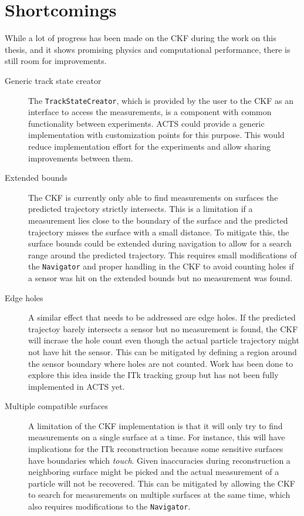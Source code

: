 \section{Shortcomings}

While a lot of progress has been made on the CKF during the work on this thesis, and it shows promising physics and computational performance, there is still room for improvements.

\begin{description}
    \item[Generic track state creator] The \texttt{TrackStateCreator}, which is provided by the user to the CKF as an interface to access the measurements, is a component with common functionality between experiments. ACTS could provide a generic implementation with customization points for this purpose. This would reduce implementation effort for the experiments and allow sharing improvements between them.
    \item[Extended bounds] The CKF is currently only able to find measurements on surfaces the predicted trajectory strictly intersects. This is a limitation if a measurement lies close to the boundary of the surface and the predicted trajectory misses the surface with a small distance. To mitigate this, the surface bounds could be extended during navigation to allow for a search range around the predicted trajectory. This requires small modifications of the \texttt{Navigator} and proper handling in the CKF to avoid counting holes if a sensor was hit on the extended bounds but no measurement was found.
    \item[Edge holes] A similar effect that needs to be addressed are edge holes. If the predicted trajectoy barely intersects a sensor but no measurement is found, the CKF will incrase the hole count even though the actual particle trajectory might not have hit the sensor. This can be mitigated by defining a region around the sensor boundary where holes are not counted. Work has been done to explore this idea inside the ITk tracking group but has not been fully implemented in ACTS yet.
    \item[Multiple compatible surfaces] A limitation of the CKF implementation is that it will only try to find measurements on a single surface at a time. For instance, this will have implications for the ITk reconstruction because some sensitive surfaces have boundaries which \textit{touch}. Given inaccuracies during reconstruction a neighboring surface might be picked and the actual measurement of a particle will not be recovered. This can be mitigated by allowing the CKF to search for measurements on multiple surfaces at the same time, which also requires modifications to the \texttt{Navigator}.

\end{description}
